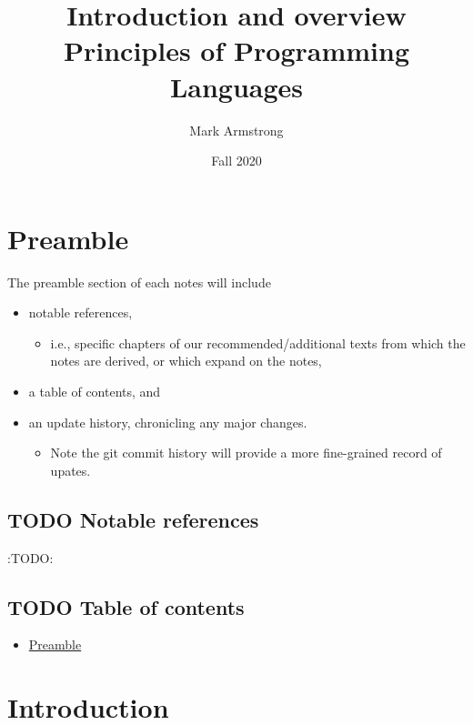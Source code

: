 \documentclass[11pt]{article}
\author{Mark Armstrong}
\date{Fall 2020}
\title{Introduction and overview\\\medskip
\large Principles of Programming Languages}
\theoremstyle{definition}
\begin{document}
\maketitle

\section{Preamble}
\label{sec:org89047f4}

The preamble section of each notes will include
\begin{itemize}
\item notable references,
\begin{itemize}
\item i.e., specific chapters of our recommended/additional texts
from which the notes are derived, or which expand on the notes,
\end{itemize}
\item a table of contents, and
\item an update history, chronicling any major changes.
\begin{itemize}
\item Note the git commit history will provide a more fine-grained
record of upates.
\end{itemize}
\end{itemize}

\subsection{{\bfseries\sffamily TODO} Notable references}
\label{sec:org930ca07}

:TODO:

\subsection{{\bfseries\sffamily TODO} Table of contents}
\label{sec:orga657f17}

\begin{scriptsize}
\begin{itemize}
\item \hyperref[sec:org89047f4]{Preamble}
\end{itemize}
\end{scriptsize}

\section{Introduction}
\label{sec:orgb15be4a}
\end{document}
